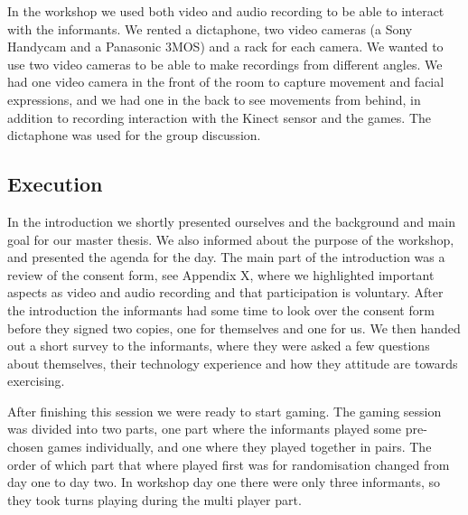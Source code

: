 In the workshop we used both video and audio recording to be able to interact with the informants. We rented a dictaphone, two video cameras (a Sony Handycam and a Panasonic 3MOS) and a rack for each camera. We wanted to use two video cameras to be able to make recordings from different angles. We had one video camera in the front of the room to capture movement and facial expressions, and we had one in the back to see movements from behind, in addition to recording interaction with the Kinect sensor and the games. The dictaphone was used for the group discussion.      

\subsection{Execution}
In the introduction we shortly presented ourselves and the background and main goal for our master thesis. We also informed about the purpose of the workshop, and presented the agenda for the day. The main part of the introduction was a review of the consent form, see Appendix X, where we highlighted important aspects as video and audio recording and that participation is voluntary. After the introduction the informants had some time to look over the consent form before they signed two copies, one for themselves and one for us. We then handed out a short survey to the informants, where they were asked a few questions about themselves, their technology experience and how they attitude are towards exercising. 

After finishing this session we were ready to start gaming. The gaming session was divided into two parts, one part where the informants played some pre-chosen games individually, and one where they played together in pairs. The order of which part that where played first was for randomisation changed from day one to day two. In workshop day one there were only three informants, so they took turns playing during the multi player part. 

